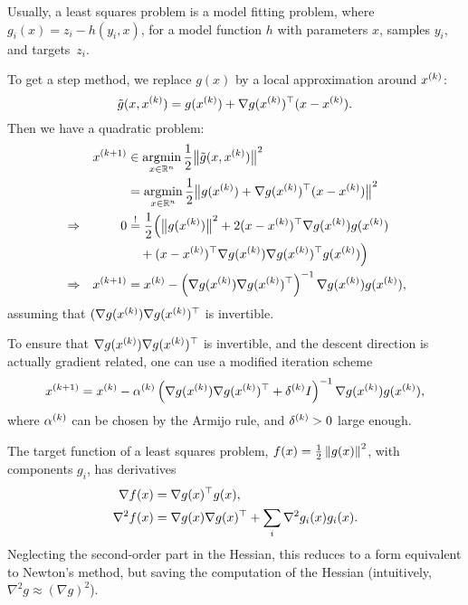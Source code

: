 \documentclass{article}
\begin{document}
Usually, a least squares problem is a model fitting problem, where \(g_i(x) = z_i - h(y_i, x)\), for
a model function \(h\) with parameters \(x\), samples \(y_i\), and targets~\(z_i\).


\label{s:gauss_newton_method}

To get a step method, we replace \(g(x)\) by a local approximation around \(\kth{x}\):
\begin{equation*}
  \tilde{g}(x, \kth{x}) = g(\kth{x}) + \T{\nabla g(\kth{x})}(x - \kth{x}).
\end{equation*}
Then we have a quadratic problem:
\begin{align*}
  & &\kth[k+1]{x} &\in \argmin_{x \in \RR^n} \frac{1}{2} \enVert[1]{\tilde{g}(x, \kth{x})}^2 \\
  & & &= \argmin_{x \in \RR^n} \frac{1}{2} \enVert[1]{g(\kth{x}) + \T{\nabla g(\kth{x})}(x -
        \kth{x})}^2 \\
  &\Rightarrow &0 &\overset{!}{=} \frac{1}{2} \Big(\enVert[1]{g(\kth{x})}^2
                                  + 2\T{(x - \kth{x})} \nabla g(\kth{x}) g(\kth{x}) \\
  & & &\quad+ \T{(x - \kth{x})} \nabla g(\kth{x}) \T{\nabla g(\kth{x})} g(\kth{x}) \Big) \\
  &\Rightarrow &\kth[k+1]{x} &= \kth{x} - \left(\nabla g(\kth{x}) \T{\nabla
                                  g(\kth{x})}\right)^{-1}
                                  \nabla g(\kth{x}) g(\kth{x}),
\end{align*}
assuming that \((\nabla g(\kth{x}) \T{\nabla g(\kth{x})}\) is invertible.


\label{s:levenberg_method}

To ensure that \(\nabla g(\kth{x}) \T{\nabla g(\kth{x})}\) is invertible, and the descent direction
is actually gradient related, one can use a modified iteration scheme
\begin{equation*}
  \kth[k+1]{x} = \kth{x} - \kth{\alpha}\left(\nabla g(\kth{x}) \T{\nabla g(\kth{x})} + \kth{\delta} I\right)^{-1}
  \nabla g(\kth{x}) g(\kth{x}),
\end{equation*}
where \(\kth{\alpha}\) can be chosen by the Armijo rule, and \(\kth{\delta} > 0\) large enough.



The target function of a least squares problem, \(f(x) = \frac{1}{2}\enVert[0]{g(x)}^2\), with
components \(g_i\), has derivatives
\begin{align*}
  \nabla f(x) &= \T{\nabla g(x)} g(x), \\
  \nabla^2 f(x) &= \nabla g(x) \T{\nabla g(x)} + \sum_i \nabla^2 g_i(x) g_i(x).
\end{align*}
Neglecting the second-order part in the Hessian, this reduces to a form equivalent to Newton's
method, but saving the computation of the Hessian (intuitively, \(\nabla^2 g \approx (\nabla g)^2\)).
\end{document}
